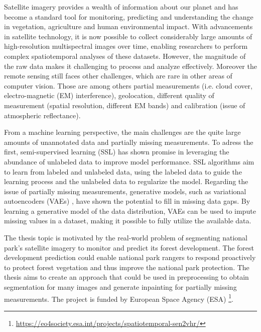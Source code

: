 

Satellite imagery provides a wealth of information about our planet and has become a standard tool for monitoring, predicting and understanding 
the change in vegetation, agriculture and human environmental impact. With advancements in satellite technology, it is now possible to collect
considerably large amounts of high-resolution multispectral images over time, enabling researchers to perform complex spatiotemporal analyses of these 
datasets. However, the magnitude of the raw data makes it challenging to process and analyze effectively. Moreover the remote sensing 
still faces other challenges, which are rare in other areas of computer vision. Those are among others partial measurements 
(i.e. cloud cover, electro-magnetic (EM) interference), geolocation, different quality of measurement (spatial resolution, different EM bands) and 
calibration (issue of atmospheric reflectance).

From a machine learning perspective, the main challenges are the quite large amounts of unannotated data and partially missing measurements.
To adress the first, semi-supervised learning \cite{ssl-book-2006} (SSL) has shown promise in leveraging the abundance of unlabeled
data to improve model performance. SSL algorithms aim to learn from labeled and unlabeled data, using the labeled data to guide the 
learning process and the unlabeled data to regularize the model. Regarding the issue of partially missing measurements, generative
models, such as variational autoencoders (VAEs) \cite{intro-vae-2019}, have shown the potential to fill in missing data gaps. 
By learning a generative model of the data distribution, VAEs can be used to impute missing values in a dataset, making it possible to 
fully utilize the available data.

The thesis topic is motivated by the real-world problem of segmenting national park's satellite imagery to monitor and predict 
its forest development. The forest development prediction could enable national park rangers to respond proactively to protect forest vegetation and thus
improve the national park protection. The thesis aims to create an approach that could be used in preprocessing to obtain segmentation for many images and 
generate inpainting for partially missing measurements. The project is funded by European Space Agency (ESA)
\footnote[1]{\url{https://eo4society.esa.int/projects/spatiotemporal-sen2vhr/}}.

